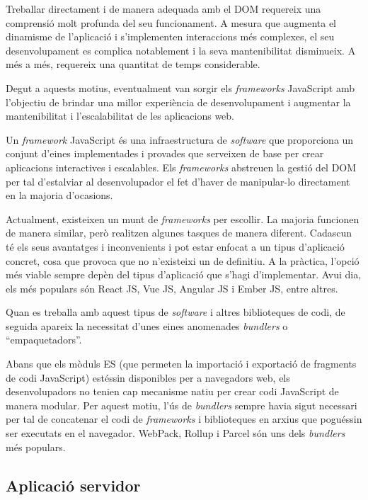 \documentclass[a4paper,12pt]{ThesisStyle}
\begin{document}
Treballar directament i de manera adequada amb el DOM requereix una comprensió molt profunda del seu funcionament. A mesura que augmenta el dinamisme de l'aplicació i s'implementen interaccions més complexes, el seu desenvolupament es complica notablement i la seva mantenibilitat disminueix. A més a més, requereix una quantitat de temps considerable.

Degut a aquests motius, eventualment van sorgir els \textit{frameworks} JavaScript amb l'objectiu de brindar una millor experiència de desenvolupament i augmentar la mantenibilitat i l'escalabilitat de les aplicacions web.

Un \textit{framework} JavaScript és una infraestructura de \textit{software} que proporciona un conjunt d'eines implementades i provades que serveixen de base per crear aplicacions interactives i escalables. Els \textit{frameworks} abstreuen la gestió del DOM per tal d'estalviar al desenvolupador el fet d'haver de manipular-lo directament en la majoria d'ocasions.

Actualment, existeixen un munt de \textit{frameworks} per escollir. La majoria funcionen de manera similar, però realitzen algunes tasques de manera diferent. Cadascun té els seus avantatges i inconvenients i pot estar enfocat a un tipus d'aplicació concret, cosa que provoca que no n'existeixi un de definitiu. A la pràctica, l'opció més viable sempre depèn del tipus d'aplicació que s'hagi d'implementar. Avui dia, els més populars són React JS, Vue JS, Angular JS i Ember JS, entre altres.

Quan es treballa amb aquest tipus de \textit{software} i altres biblioteques de codi, de seguida apareix la necessitat d'unes eines anomenades \textit{bundlers} o ``empaquetadors''.

Abans que els mòduls ES (que permeten la importació i exportació de fragments de codi JavaScript) estéssin disponibles per a navegadors web, els desenvolupadors no tenien cap mecanisme natiu per crear codi JavaScript de manera modular. Per aquest motiu, l'ús de \textit{bundlers} sempre havia sigut necessari per tal de concatenar el codi de \textit{frameworks} i biblioteques en arxius que poguéssin ser executats en el navegador. WebPack, Rollup i Parcel són uns dels \textit{bundlers} més populars.

\subsection{Aplicació servidor}
\label{subsec:aplicacio_servidor}
\end{document}
